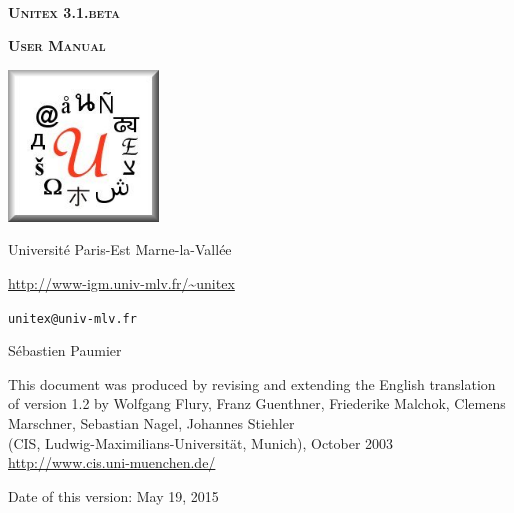 
\begin{titlepage}
\begin{center}

~

\vspace{3cm}
\Huge
\textsc{\textbf{Unitex 3.1.beta}}

\vspace{1cm}

\huge
\textsc{\textbf{User Manual}}

\vspace{2cm}

  \begin{center}
    \includegraphics[width=4cm]{resources/img/logo-Unitex.png}
  \end{center}
\normalsize

\vspace{2cm}

\LARGE

Université Paris-Est Marne-la-Vallée
\bigskip
\normalsize

\url{http://www-igm.univ-mlv.fr/~unitex}

\verb$unitex@univ-mlv.fr$

\vspace{0.5cm}

Sébastien Paumier
\bigskip

This document was produced by revising and extending the English translation\\
of version 1.2 by Wolfgang Flury, Franz Guenthner, Friederike Malchok, Clemens Marschner, 
 Sebastian Nagel, Johannes Stiehler\\
 (CIS, Ludwig-Maximilians-Universit\"at, Munich), October 2003\\
\url{http://www.cis.uni-muenchen.de/}

\bigskip
Date of this version: May 19, 2015
\end{center}

\end{titlepage}
